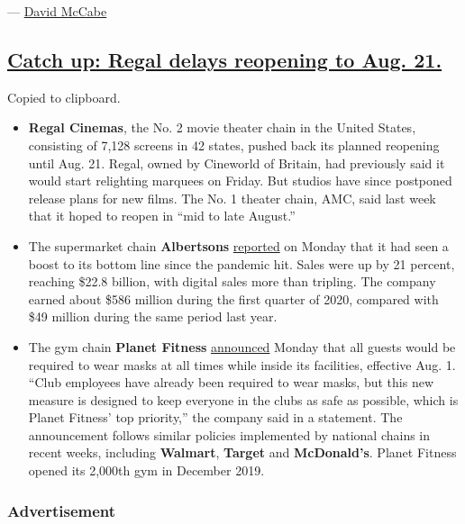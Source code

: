 --- \href{https://www.nytimes.com/by/david-mccabe}{David McCabe}

\hypertarget{catch-up-regal-delays-reopening-to-aug-21}{%
\subsection{\texorpdfstring{\protect\hyperlink{catch-up-regal-delays-reopening-to-aug-21}{Catch
up: Regal delays reopening to Aug.
21.}}{Catch up: Regal delays reopening to Aug. 21.}}\label{catch-up-regal-delays-reopening-to-aug-21}}

Copied to clipboard.

\begin{itemize}
\item
  \textbf{Regal Cinemas}, the No. 2 movie theater chain in the United
  States, consisting of 7,128 screens in 42 states, pushed back its
  planned reopening until Aug. 21. Regal, owned by Cineworld of Britain,
  had previously said it would start relighting marquees on Friday. But
  studios have since postponed release plans for new films. The No. 1
  theater chain, AMC, said last week that it hoped to reopen in ``mid to
  late August.''
\item
  The supermarket chain \textbf{Albertsons}
  \href{https://investor.albertsonscompanies.com/file/Index?KeyFile=404748481}{reported}
  on Monday that it had seen a boost to its bottom line since the
  pandemic hit. Sales were up by 21 percent, reaching \$22.8 billion,
  with digital sales more than tripling. The company earned about \$586
  million during the first quarter of 2020, compared with \$49 million
  during the same period last year.
\item
  The gym chain \textbf{Planet Fitness}
  \href{https://www.planetfitness.com/club-cleanliness}{announced}
  Monday that all guests would be required to wear masks at all times
  while inside its facilities, effective Aug. 1. ``Club employees have
  already been required to wear masks, but this new measure is designed
  to keep everyone in the clubs as safe as possible, which is Planet
  Fitness' top priority,'' the company said in a statement. The
  announcement follows similar policies implemented by national chains
  in recent weeks, including \textbf{Walmart}, \textbf{Target} and
  \textbf{McDonald's}. Planet Fitness opened its 2,000th gym in December
  2019.
\end{itemize}

\hypertarget{advertisement-1}{%
\subsubsection{Advertisement}\label{advertisement-1}}

